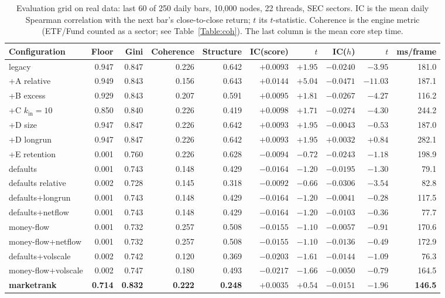 \documentclass[preprint,3p,twocolumn]{elsarticle}
\begin{document}
\begin{table}[t]
\centering
\caption{Evaluation grid on real data: last 60 of 250 daily bars, 10,000 nodes, 22 threads, SEC sectors. IC is the mean daily Spearman correlation with the next bar's close-to-close return; $t$ its $t$-statistic. Coherence is the engine metric (ETF/Fund counted as a sector; see Table~\ref{Table:coh}). The last column is the mean core step time.}
\label{Table:eval}
\small\setlength{\tabcolsep}{4pt}
\begin{tabular}{lrrrrrrrrr}
\toprule
Configuration & Floor & Gini & Coherence & Structure & IC(score) & $t$ & IC($h$) & $t$ & ms/frame\\
\midrule
legacy             & 0.947 & 0.847 & 0.226 & 0.642 & $+0.0093$ & $+1.95$ & $-0.0240$ & $-3.95$ & 181.0\\
+A relative        & 0.949 & 0.843 & 0.156 & 0.643 & $+0.0144$ & $+5.04$ & $-0.0471$ & $-11.03$ & 187.1\\
+B excess          & 0.929 & 0.843 & 0.207 & 0.591 & $+0.0095$ & $+1.81$ & $-0.0267$ & $-4.27$ & 116.2\\
+C $k_{\mathrm{in}}=10$ & 0.850 & 0.840 & 0.226 & 0.419 & $+0.0098$ & $+1.71$ & $-0.0274$ & $-4.30$ & 244.2\\
+D size            & 0.947 & 0.847 & 0.226 & 0.642 & $+0.0093$ & $+1.95$ & $-0.0043$ & $-0.53$ & 187.0\\
+D longrun         & 0.947 & 0.847 & 0.226 & 0.642 & $+0.0093$ & $+1.95$ & $+0.0032$ & $+0.84$ & 282.1\\
+E retention       & 0.001 & 0.760 & 0.226 & 0.628 & $-0.0094$ & $-0.72$ & $-0.0243$ & $-1.18$ & 198.9\\
defaults           & 0.001 & 0.743 & 0.148 & 0.429 & $-0.0164$ & $-1.20$ & $-0.0195$ & $-1.30$ & 79.1\\
defaults relative  & 0.002 & 0.728 & 0.145 & 0.318 & $-0.0092$ & $-0.66$ & $-0.0306$ & $-3.54$ & 82.8\\
defaults+longrun   & 0.001 & 0.743 & 0.148 & 0.429 & $-0.0164$ & $-1.20$ & $-0.0041$ & $-0.28$ & 117.5\\
defaults+netflow   & 0.001 & 0.743 & 0.148 & 0.429 & $-0.0164$ & $-1.20$ & $-0.0103$ & $-0.36$ & 77.7\\
money-flow         & 0.001 & 0.732 & 0.257 & 0.508 & $-0.0155$ & $-1.10$ & $-0.0057$ & $-0.91$ & 170.6\\
money-flow+netflow & 0.001 & 0.732 & 0.257 & 0.508 & $-0.0155$ & $-1.10$ & $-0.0136$ & $-0.49$ & 172.9\\
defaults+volscale  & 0.002 & 0.742 & 0.120 & 0.369 & $-0.0203$ & $-1.61$ & $-0.0144$ & $-1.09$ & 76.3\\
money-flow+volscale& 0.002 & 0.747 & 0.180 & 0.493 & $-0.0217$ & $-1.66$ & $-0.0050$ & $-0.79$ & 164.5\\
\midrule
\textbf{marketrank} & \textbf{0.714} & \textbf{0.832} & \textbf{0.222} & \textbf{0.248} & $\mathbf{+0.0035}$ & $\mathbf{+0.54}$ & $\mathbf{-0.0151}$ & $\mathbf{-1.96}$ & \textbf{146.5}\\
\bottomrule
\end{tabular}
\end{table}
\end{document}
